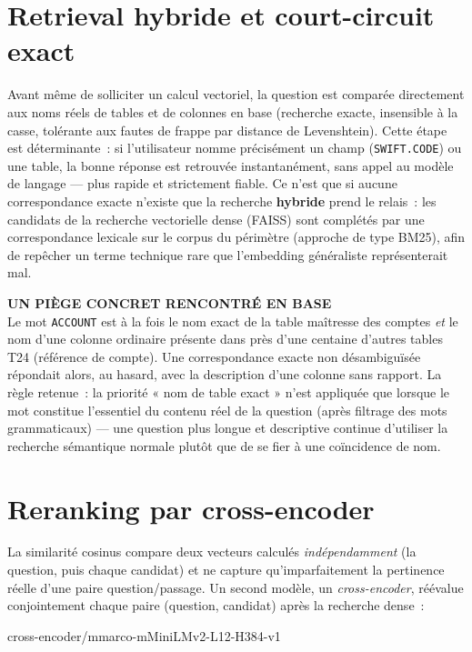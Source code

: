 ﻿\documentclass[12pt,a4paper]{report}
\newcommand{\code}[1]{\texttt{\color{biatbluedk}#1}}
\newcommand{\model}[1]{\begin{center}\ttfamily\color{biatbluedk}#1\end{center}}
\begin{document}
\section{Retrieval hybride et court-circuit exact}
Avant même de solliciter un calcul vectoriel, la question est comparée directement aux noms réels de tables et de colonnes en base (recherche exacte, insensible à la casse, tolérante aux fautes de frappe par distance de Levenshtein). Cette étape est déterminante~: si l'utilisateur nomme précisément un champ (\code{SWIFT.CODE}) ou une table, la bonne réponse est retrouvée instantanément, sans appel au modèle de langage --- plus rapide et strictement fiable. Ce n'est que si aucune correspondance exacte n'existe que la recherche \textbf{hybride} prend le relais~: les candidats de la recherche vectorielle dense (FAISS) sont complétés par une correspondance lexicale sur le corpus du périmètre (approche de type BM25), afin de repêcher un terme technique rare que l'embedding généraliste représenterait mal.

\begin{note}
\textbf{\color{biatcyan}\ttfamily\footnotesize UN PIÈGE CONCRET RENCONTRÉ EN BASE}\\[4pt]
Le mot \code{ACCOUNT} est à la fois le nom exact de la table maîtresse des comptes \emph{et} le nom d'une colonne ordinaire présente dans près d'une centaine d'autres tables T24 (référence de compte). Une correspondance exacte non désambiguïsée répondait alors, au hasard, avec la description d'une colonne sans rapport. La règle retenue~: la priorité « nom de table exact » n'est appliquée que lorsque le mot constitue l'essentiel du contenu réel de la question (après filtrage des mots grammaticaux) --- une question plus longue et descriptive continue d'utiliser la recherche sémantique normale plutôt que de se fier à une coïncidence de nom.
\end{note}

\section{Reranking par cross-encoder}
La similarité cosinus compare deux vecteurs calculés \emph{indépendamment} (la question, puis chaque candidat) et ne capture qu'imparfaitement la pertinence réelle d'une paire question/passage. Un second modèle, un \emph{cross-encoder}, réévalue conjointement chaque paire (question, candidat) après la recherche dense~:

\model{cross-encoder/mmarco-mMiniLMv2-L12-H384-v1}
\end{document}
